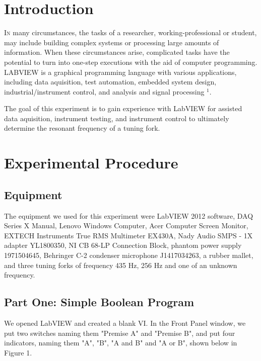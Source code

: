 \documentclass[twoside,10pt]{article}
\begin{document}
	\begin{multicols}{2} %
		
		\section{Introduction} 
		
			\lettrine[nindent=0em,lines=2]{I}n many circumstances, the tasks of a researcher, working-professional or student, may include building complex systems or processing large amounts of information. When these circumstances arise, complicated tasks have the potential to turn into one-step executions with the aid of computer programming. LABVIEW is a graphical programming language with various applications, including data aquisition, test automation, embedded system design, industrial/instrument control, and analysis and signal processing $^1$. 
			
			\indent The goal of this experiment is to gain experience with LabVIEW for assisted data aquisition, instrument testing, and instrument control to ultimately determine the resonant frequency of a tuning fork. 
			
		
		\section{Experimental Procedure}
		
		\subsection*{Equipment}
		The equipment we used for this experiment were LabVIEW 2012 software, DAQ Series X Manual, Lenovo Windows Computer, Acer Computer Screen Monitor, EXTECH Instruments True RMS Multimeter EX430A, Nady Audio SMPS - 1X adapter YL1800350, NI CB 68-LP Connection Block, phantom power supply 1971504645, Behringer C-2 condenser microphone J1417034263, a rubber mallet, and three tuning forks of frequency 435 Hz, 256 Hz and one of an unknown frequency.
		
		\subsection*{Part One: Simple Boolean Program}
		We opened LabVIEW and created a blank VI. In the Front Panel window, we put two switches naming them "Premise A" and "Premise B", and put four indicators, naming them "A", "B", "A and B" and "A or B", shown below in Figure 1. 
		

\end{multicols}
\end{document}

